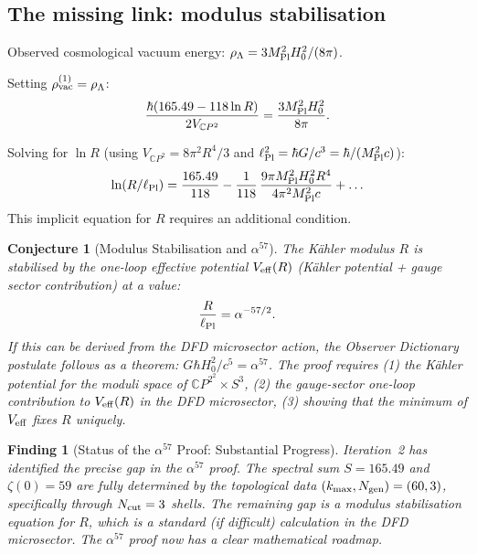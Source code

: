 \documentclass[11pt]{article}
\newtheorem{finding}{Finding}
\newtheorem{conjecture}{Conjecture}
\newcommand{\CP}{\mathbb{C}P^2}
\newcommand{\Mpl}{M_{\rm Pl}}
\newcommand{\Hzero}{H_0}
\newcommand{\alphafine}{\alpha}
\begin{document}
\subsection{The missing link: modulus stabilisation}

Observed cosmological vacuum energy: $\rho_\Lambda = 3\Mpl^2\Hzero^2/(8\pi)$.

Setting $\rho_{\rm vac}^{(1)} = \rho_\Lambda$:
\begin{equation}
  \frac{\hbar(165.49 - 118\ln R)}{2V_{\CP}}
  = \frac{3\Mpl^2\Hzero^2}{8\pi}.
\end{equation}

Solving for $\ln R$ (using $V_{\CP} = 8\pi^2 R^4/3$ and $\ell_{\rm Pl}^2
= \hbar G/c^3 = \hbar/(\Mpl^2 c)$):
\begin{equation}
  \ln(R/\ell_{\rm Pl})
  = \frac{165.49}{118} - \frac{1}{118}\,\frac{9\pi\Mpl^2\Hzero^2 R^4}{4\pi^2 \Mpl^2 c}
  + \ldots
\end{equation}
This implicit equation for $R$ requires an additional condition.

\begin{conjecture}[Modulus Stabilisation and $\alphafine^{57}$]
\label{conj:modulus}
The K\"{a}hler modulus $R$ is stabilised by the one-loop effective
potential $V_{\rm eff}(R)$ (K\"{a}hler potential + gauge sector
contribution) at a value:
\begin{equation}
  \frac{R}{\ell_{\rm Pl}} = \alphafine^{-57/2}.
\end{equation}
If this can be derived from the DFD microsector action, the Observer
Dictionary postulate follows as a theorem:
$G\hbar\Hzero^2/c^5 = \alphafine^{57}$.  The proof requires (1) the
K\"{a}hler potential for the moduli space of $\CP^2\times S^3$, (2) the
gauge-sector one-loop contribution to $V_{\rm eff}(R)$ in the DFD
microsector, (3) showing that the minimum of $V_{\rm eff}$ fixes
$R$ uniquely.
\end{conjecture}

\begin{finding}[Status of the $\alpha^{57}$ Proof: Substantial Progress]
\label{find:alpha57}
Iteration~2 has identified the precise gap in the $\alpha^{57}$ proof.
The spectral sum $S = 165.49$ and $\zeta(0) = 59$ are fully determined
by the topological data $(k_{\max}, N_{\rm gen}) = (60, 3)$, specifically
through $N_{\rm cut} = 3$ shells.  The remaining gap is a modulus
stabilisation equation for $R$, which is a standard (if difficult)
calculation in the DFD microsector.  The $\alpha^{57}$ proof now has a
clear mathematical roadmap.
\end{finding}
\end{document}
